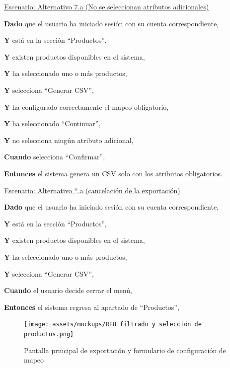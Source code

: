 \underline{Escenario: Alternativo 7.a (No se seleccionan atributos adicionales)}\par
\textbf{Dado} que el usuario ha iniciado sesión con su cuenta correspondiente,\par
\textbf{Y} está en la sección \enquote{Productos},\par
\textbf{Y} existen productos disponibles en el sistema,\par
\textbf{Y} ha seleccionado uno o más productos,\par
\textbf{Y} selecciona \enquote{Generar CSV},\par
\textbf{Y} ha configurado correctamente el mapeo obligatorio,\par
\textbf{Y} ha seleccionado \enquote{Continuar},\par
\textbf{Y} no selecciona ningún atributo adicional,\par
\textbf{Cuando} selecciona \enquote{Confirmar},\par
\textbf{Entonces} el sistema genera un CSV solo con los atributos obligatorios.\par
\vspace{0.20cm}

\underline{Escenario: Alternativo *.a (cancelación de la exportación)}\par
\vspace{0.15cm}
\textbf{Dado} que el usuario ha iniciado sesión con su cuenta correspondiente,\par
\textbf{Y} está en la sección \enquote{Productos},\par
\textbf{Y} existen productos disponibles en el sistema,\par
\textbf{Y} ha seleccionado uno o más productos,\par
\textbf{Y} selecciona \enquote{Generar CSV},\par
\textbf{Cuando} el usuario decide cerrar el menú,\par
\textbf{Entonces} el sistema regresa al apartado de \enquote{Productos},\par

\begin{figure}[H]
    \texttt{[image: assets/mockups/RF8 filtrado y selección de productos.png]}
    \caption{Pantalla principal de exportación y formulario de configuración de mapeo}
\end{figure}

